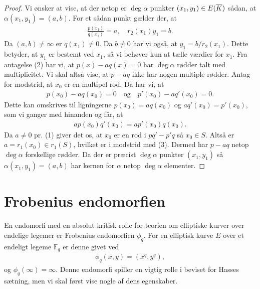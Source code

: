 \begin{proof}
Vi ønsker at vise, at der netop er $\deg \alpha$ punkter $(x_1, y_1) \in E(\overline{K})$ sådan,
at $\alpha(x_1, y_1) = (a, b)$. For et sådan punkt gælder der, at 
\begin{align*}
	\frac{p(x_1)}{q(x_1)} = a, \quad r_2(x_1) y_1 = b.
\end{align*}
Da $(a, b) \neq \infty$ er $q(x_1) \neq 0$. %
Da $b \neq 0$ har vi også, at $y_1 = b / r_2(x_1)$. Dette betyder, at $y_1$ er bestemt
ved $x_1$, så vi behøver kun at tælle værdier for $x_1$. Fra antagelse (2) har vi, at 
$p(x) - aq(x) = 0$ har $\deg \alpha$ rødder talt med multiplicitet. Vi skal altså vise,
at $p-aq$ ikke har nogen multiple rødder. Antag for modstrid, at $x_0$ er en multipel
rod. Da har vi, at
\begin{align*}
	p(x_0) - aq(x_0) = 0 \quad \text{og} \quad p'(x_0) - aq'(x_0) = 0.
\end{align*}
Dette kan omskrives til ligningerne $p(x_0)=aq(x_0)$ og $aq'(x_0)=p'(x_0)$, 
som vi ganger med hinanden og får, at 
\begin{align*}
	a p(x_0)q'(x_0) = ap'(x_0)q(x_0).
\end{align*} 
Da $a \neq 0$ pr. (1) giver det os, at $x_0$ er en rod i $pq'-p'q$ så $x_0 \in S$.
Altså er $a=r_1(x_0) \in r_1(S)$, hvilket er i modstrid med (3). Dermed har 
$p-aq$ netop $\deg \alpha$ forskellige rødder. Da der er præcist $\deg \alpha$ 
punkter $(x_1, y_1)$ så $\alpha(x_1, y_1) = (a, b)$ har kernen for $\alpha$ netop
$\deg \alpha$ elementer.
\end{proof}


\section{Frobenius endomorfien}

En endomorfi med en absolut kritisk rolle for teorien om elliptiske kurver over endelige legemer er Frobenius endomorfien $\phi_q$. For en elliptisk kurve $E$ over et endeligt legeme $\mathbb{F}_q$ er denne givet ved
\begin{align}
	\phi_q (x, y) = (x^q, y^q),
\end{align}
og $\phi_q(\infty) = \infty$.
Denne endomorfi spiller en vigtig rolle i beviset for Hasses sætning, men vi skal først vise nogle af dens egenskaber.


